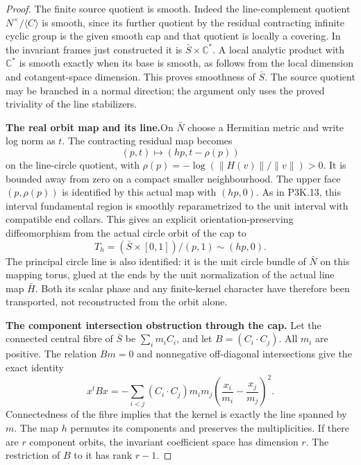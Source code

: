\begin{proof}
The finite source quotient is smooth.  Indeed the line-complement
quotient \(N^\times/\langle C\rangle\) is smooth, since
its further quotient by the residual contracting infinite cyclic
group is the given smooth cap and that quotient is locally a
covering.  In the invariant frames just constructed it is
\(\bar S\times\mathbb C^*\).  A local analytic product
with \(\mathbb C^*\) is smooth exactly when its base is
smooth, as follows from the local dimension and cotangent-space
dimension.  This proves smoothness of \(\bar S\).
The source quotient may be branched in a normal direction; the
argument only uses the proved triviality of the line stabilizers.

\par\medskip\noindent\textbf{The real orbit map and its line.}\enspace On \(\bar N\)
choose a Hermitian metric and write log norm as \(t\).
The contracting residual map becomes
\[
(p,t)\longmapsto(hp,t-\rho(p))
\]
on the line-circle quotient, with
\(\rho(p)=-\log(\|H(v)\|/\|v\|)>0\).  It is
bounded away from zero on a compact smaller neighbourhood.
The upper face \((p,\rho(p))\) is identified by this actual
map with \((hp,0)\).  As in P3K.13, this interval fundamental
region is smoothly
reparametrized to the unit interval with compatible end collars.
This gives an explicit orientation-preserving diffeomorphism
from the actual circle orbit of the cap to
\[
           T_h=(\bar S\times[0,1])/(p,1)\sim(hp,0).
\]
The principal circle line is also identified: it is the unit
circle bundle of \(\bar N\) on this mapping torus, glued at
the ends by the unit normalization of the actual line map
\(\bar H\).  Both its scalar phase and any finite-kernel
character have therefore been transported, not reconstructed
from the orbit alone.

\par\medskip\noindent\textbf{The component intersection obstruction through the cap.}\enspace
Let the connected central fibre of \(\bar S\) be
\(\sum_i m_i C_i\), and let \(B=(C_i\cdot C_j)\).
All \(m_i\) are positive.  The relation \(B m=0\) and
nonnegative off-diagonal intersections give the exact identity
\[
 x^tBx=-\sum_{i<j}(C_i\cdot C_j)m_i m_j
       \left(\frac{x_i}{m_i}-\frac{x_j}{m_j}\right)^2.
\]
Connectedness of the fibre implies that the kernel is exactly
the line spanned by \(m\).  The map \(h\) permutes its
components and preserves the multiplicities.  If there are
\(r\) component orbits, the invariant coefficient space has
dimension \(r\).  The restriction of \(B\) to it has
rank \(r-1\).


\end{proof}
